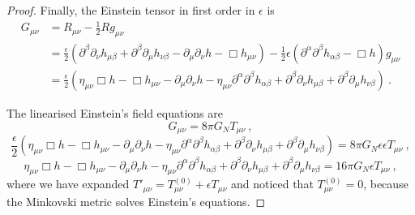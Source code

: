 \begin{proof}
        Finally, the Einstein tensor in first order in $\epsilon$ is 
        \begin{equation*}
        \begin{aligned}
            G_{\mu\nu} & = R_{\mu\nu} - \frac{1}{2} R g_{\mu\nu} \\ & = \frac{\epsilon}{2} (\partial^\beta \partial_\nu h_{\mu\beta} + \partial^\beta \partial_\mu h_{\nu\beta} - \partial_\mu \partial_\nu h - \Box h_{\mu\nu} ) - \frac{1}{2} \epsilon (\partial^\alpha \partial^\beta h_{\alpha\beta } - \Box h ) g_{\mu\nu} \\ & = \frac{\epsilon}{2} ( \eta_{\mu\nu} \Box h - \Box h_{\mu\nu} - \partial_\mu \partial_\nu h - \eta_{\mu\nu} \partial^\alpha \partial^\beta h_{\alpha\beta} + \partial^\beta \partial_\nu h_{\mu\beta} + \partial^\beta \partial_\mu h_{\nu\beta} ) ~.
        \end{aligned}
        \end{equation*}

        The linearised Einstein's field equations are 
        \begin{equation*}
            G_{\mu\nu} = 8 \pi G_N T_{\mu\nu} ~,
        \end{equation*}
        \begin{equation*}
            \frac{\epsilon}{2} ( \eta_{\mu\nu} \Box h - \Box h_{\mu\nu} - \partial_\mu \partial_\nu h - \eta_{\mu\nu} \partial^\alpha \partial^\beta h_{\alpha\beta}  + \partial^\beta \partial_\nu h_{\mu\beta} + \partial^\beta \partial_\mu h_{\nu\beta} ) = 8 \pi G_N \epsilon \epsilon T_{\mu\nu} ~,
        \end{equation*}
        \begin{equation*}
            \eta_{\mu\nu} \Box h - \Box h_{\mu\nu} - \partial_\mu \partial_\nu h - \eta_{\mu\nu} \partial^\alpha \partial^\beta h_{\alpha\beta}  + \partial^\beta \partial_\nu h_{\mu\beta} + \partial^\beta \partial_\mu h_{\nu\beta} = 16 \pi G_N \epsilon T_{\mu\nu} ~,
        \end{equation*}
        where we have expanded ${T'}_{\mu\nu} = T^{(0)}_{\mu\nu} + \epsilon T_{\mu\nu}$ and noticed that $T_{\mu\nu}^{(0)}= 0$, because the Minkovski metric solves Einstein's equations. 
    \end{proof}

